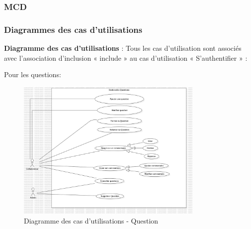 \documentclass{article}
\begin{document}
            \subsubsection{MCD}

            \subsubsection{Diagrammes des cas d'utilisations}
                \textbf{Diagramme des cas d'utilisations} : Tous les cas d'utilisation sont associés avec l'association d'inclusion « include » au 
                cas d'utilisation « S'authentifier » :
                
                Pour les questions: 
                \begin{figure}[h!]
                    \centering
                    \includegraphics[width=0.8\textwidth]{assets/diagrammes/jpg/Model1!useCaseQuestion_0.jpg}
                    \caption{Diagramme des cas d'utilisations - Question}
                \end{figure}
                
                \FloatBarrier
                
\end{document}
